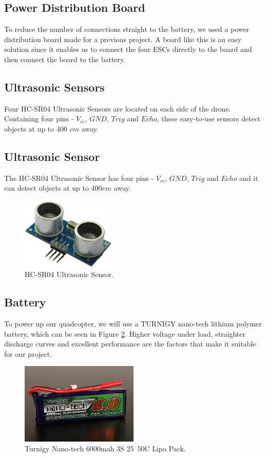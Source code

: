 \subsection{Power Distribution Board}
To reduce the number of connections straight to the battery, we used a power distribution board made for a previous project. A board like this is an easy solution since it enables us to connect the four ESCs directly to the board and then connect the board to the battery.

\subsection{Ultrasonic Sensors}
Four HC-SR04 Ultrasonic Sensors are located on each side of the drone. Containing four pins - $V_{cc}$, $GND$, $Trig$ and $Echo$, these easy-to-use sensors detect objects at up to 400 $cm$ away.
\subsection{Ultrasonic Sensor}
The HC-SR04 Ultrasonic Sensor has four pins - $V_{cc}$, $GND$, $Trig$ and $Echo$ and it can detect objects at up to 400$cm$ away. 
\begin{figure}[H]
  \centering
    \includegraphics[width=0.4\textwidth]{images/HCSR04.jpg}
	\caption{HC-SR04 Ultrasonic Sensor.\cite{UltrasonicFig}}
	\label{HC}
\end{figure}

\subsection{Battery}
To power up our quadcopter, we will use a TURNIGY nano-tech lithium polymer battery, which can be seen in Figure \ref{battery}. Higher voltage under load, straighter discharge curves and excellent performance are the factors that make it suitable for our project. 

\begin{figure}[H]
  \centering
    \includegraphics[width=0.5\textwidth]{images/battery.jpg}
	\caption{Turnigy Nano-tech 6000mah 3S 25~50C Lipo Pack.\cite{batteryFig}}
	\label{battery}
\end{figure}

